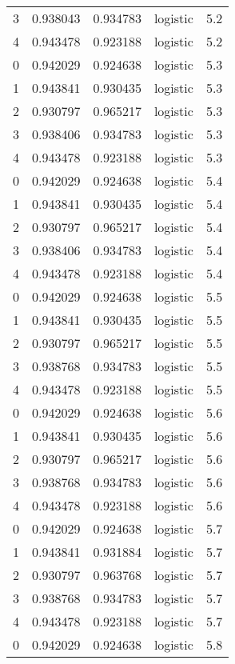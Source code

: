 \begin{tabular}{rrrlr}
     3 & 0.938043 & 0.934783 & logistic &        5.2 \\
     4 & 0.943478 & 0.923188 & logistic &        5.2 \\
     0 & 0.942029 & 0.924638 & logistic &        5.3 \\
     1 & 0.943841 & 0.930435 & logistic &        5.3 \\
     2 & 0.930797 & 0.965217 & logistic &        5.3 \\
     3 & 0.938406 & 0.934783 & logistic &        5.3 \\
     4 & 0.943478 & 0.923188 & logistic &        5.3 \\
     0 & 0.942029 & 0.924638 & logistic &        5.4 \\
     1 & 0.943841 & 0.930435 & logistic &        5.4 \\
     2 & 0.930797 & 0.965217 & logistic &        5.4 \\
     3 & 0.938406 & 0.934783 & logistic &        5.4 \\
     4 & 0.943478 & 0.923188 & logistic &        5.4 \\
     0 & 0.942029 & 0.924638 & logistic &        5.5 \\
     1 & 0.943841 & 0.930435 & logistic &        5.5 \\
     2 & 0.930797 & 0.965217 & logistic &        5.5 \\
     3 & 0.938768 & 0.934783 & logistic &        5.5 \\
     4 & 0.943478 & 0.923188 & logistic &        5.5 \\
     0 & 0.942029 & 0.924638 & logistic &        5.6 \\
     1 & 0.943841 & 0.930435 & logistic &        5.6 \\
     2 & 0.930797 & 0.965217 & logistic &        5.6 \\
     3 & 0.938768 & 0.934783 & logistic &        5.6 \\
     4 & 0.943478 & 0.923188 & logistic &        5.6 \\
     0 & 0.942029 & 0.924638 & logistic &        5.7 \\
     1 & 0.943841 & 0.931884 & logistic &        5.7 \\
     2 & 0.930797 & 0.963768 & logistic &        5.7 \\
     3 & 0.938768 & 0.934783 & logistic &        5.7 \\
     4 & 0.943478 & 0.923188 & logistic &        5.7 \\
     0 & 0.942029 & 0.924638 & logistic &        5.8 \\

\end{tabular}
